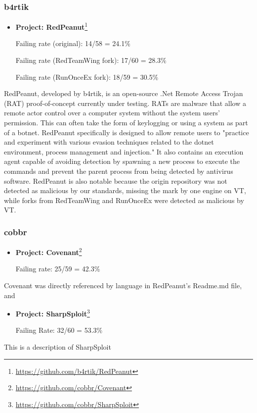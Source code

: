 \documentclass[]{acmart}
\begin{document}
\subsubsection{b4rtik}
\begin{itemize}
    \item { \bf Project: RedPeanut}\footnote{\url{https://github.com/b4rtik/RedPeanut}}
    
    Failing rate (original): 14/58 = 24.1\%
    
    Failing rate (RedTeamWing fork): 17/60 = 28.3\%
    
    Failing rate (RunOnceEx fork): 18/59 = 30.5\%
    \end{itemize}
RedPeanut, developed by b4rtik, is an open-source .Net Remote Access Trojan (RAT) proof-of-concept currently under testing. RATs are malware that allow a remote actor control over a computer system without the system users' permission. This can often take the form of keylogging or using a system as part of a botnet. RedPeanut specifically is designed to allow remote users to "practice and experiment with various evasion techniques related to the dotnet environment, process management and injection." It also contains an execution agent capable of avoiding detection by spawning a new process to execute the commands and prevent the parent process from being detected by antivirus software. RedPeanut is also notable because the origin repository was not detected as malicious by our standards, missing the mark by one engine on VT, while forks from RedTeamWing and RunOnceEx were detected as malicious by VT. 
    
\subsubsection{cobbr}
\begin{itemize}
    \item { \bf Project: Covenant}\footnote{\url{https://github.com/cobbr/Covenant}}
    
    Failing rate: 25/59 = 42.3\%
    \end{itemize}
Covenant was directly referenced by language in RedPeanut's Readme.md file, and 
\begin{itemize}
    \item{ \bf Project: SharpSploit}\footnote{\url{https://github.com/cobbr/SharpSploit}}
    
    Failing Rate: 32/60 = 53.3\%
\end{itemize}
This is a description of SharpSploit
\end{document}
